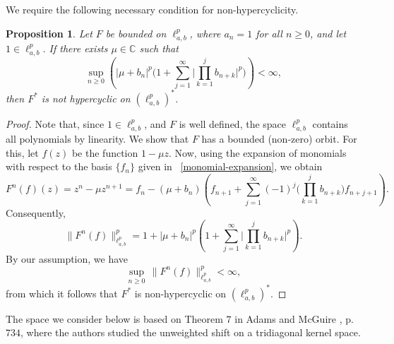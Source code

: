 \documentclass[12pt, reqno]{amsart}
\newtheorem{proposition}[theorem]{Proposition}
\theoremstyle{definition}
\theoremstyle{remark}
\numberwithin{equation}{section}
\begin{document}
We require the following necessary condition for non-hypercyclicity.

\begin{proposition}
Let $F$ be bounded on $\ell^p_{a,b}$, where $a_n=1$ for all $n\geq 0$, and let $1\in \ell^p_{a,b} $. If there exists $\mu \in \mathbb{C}$ such that
\[
\sup_{n\geq 0}\left(|\mu+b_{n}|^{p}\Big(1+\sum_{j=1}^{\infty}
\Big|\prod_{k=1}^{j} b_{n+k}\Big|^{p}\Big)\right)<\infty,
\]
then $F^*$ is not hypercyclic on $(\ell^p_{a,b})^{*}$.
\end{proposition}
\begin{proof}
     Note that, since $1\in \ell^p_{a,b}$, and $F$ is well defined, the space $\ell^p_{a,b}$ contains all polynomials by linearity. We show that $F$ has a bounded (non-zero) orbit. For this, let $f(z)$ be the function $1-\mu z$. Now, using the expansion of monomials with respect to the basis $\{f_n\}$ 
given in ~\eqref{monomial-expansion}, we obtain
\[
F^{n}(f)(z)=z^{n}-\mu z^{n+1}
= f_{n}-(\mu+b_{n})\left( f_{n+1}
+\sum_{j=1}^{\infty}(-1)^j\Big(\prod_{k=1}^{j} b_{n+k}\Big)
f_{n+j+1}\right).
\]
Consequently,
\[
\| F^{n}(f) \|^{p}_{\ell^{p}_{a,b}}
= 1+|\mu+b_{n}|^{p}\left(1 +\sum_{j=1}^{\infty}
\Big|\prod_{k=1}^{j} b_{n+k}\Big|^{p}\right).
\]
By our assumption, we have
\[
\sup_{n\geq 0} \, \| F^{n}(f) \|^{p}_{\ell^{p}_{a,b}} < \infty,
\]
from which it follows that $F^{*}$ is non-hypercyclic on $(\ell^{p}_{a,b})^{*}$.
\end{proof}
The space we consider below is based on Theorem $7$ in Adams and McGuire \cite{Adams-McGuire}, p. $734$, where the authors studied the unweighted shift on a tridiagonal kernel space.
\end{document}
